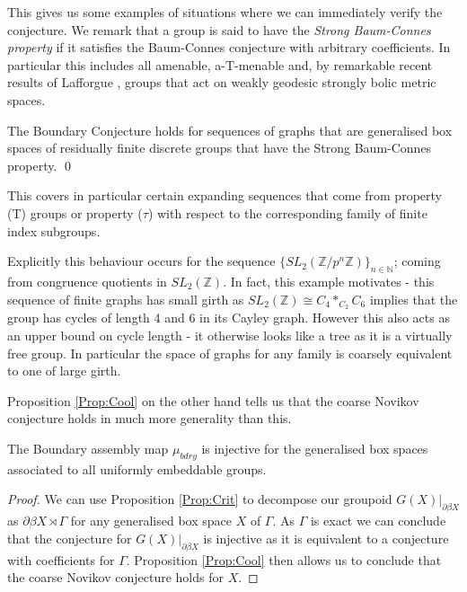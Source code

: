 \begin{conjecture}
This gives us some examples of situations where we can immediately verify the conjecture. We remark that a group is said to have the \textit{Strong Baum-Connes property} if it satisfies the Baum-Connes conjecture with arbitrary coefficients. In particular this includes all amenable, a-T-menable \cite{MR1487204} and, by remarkable recent results of Lafforgue \cite{lafforgue2012}, groups that act on weakly geodesic strongly bolic metric spaces.

\begin{theorem}
The Boundary Conjecture holds for sequences of graphs that are generalised box spaces of residually finite discrete groups that have the Strong Baum-Connes property. \qed
\end{theorem}

This covers in particular certain expanding sequences that come from property (T) groups or property ($\tau$) with respect to the corresponding family of finite index subgroups. 

Explicitly this behaviour occurs for the sequence $\lbrace SL_{2}(\mathbb{Z}/p^{n}\mathbb{Z})\rbrace_{n\in\mathbb{N}}$; coming from congruence quotients in $SL_{2}(\mathbb{Z})$. In fact, this example motivates \cite{MR2568691} - this sequence of finite graphs has small girth as $SL_{2}(\mathbb{Z}) \cong C_{4}\ast_{C_{2}}C_{6}$ implies that the group has cycles of length 4 and 6 in its Cayley graph. However this also acts as an upper bound on cycle length - it otherwise looks like a tree as it is a virtually free group. In particular the space of graphs for any family is coarsely equivalent to one of large girth. 

Proposition \ref{Prop:Cool} on the other hand tells us that the coarse Novikov conjecture holds in much more generality than this. 

\begin{theorem}\label{Thm:GBS}
The Boundary assembly map $\mu_{bdry}$ is injective for the generalised box spaces associated to all uniformly embeddable groups.
\end{theorem}
\begin{proof}
We can use Proposition \ref{Prop:Crit} to decompose our groupoid $G(X)|_{\partial \beta X}$ as $\partial\beta X \rtimes \Gamma$ for any generalised box space $X$ of $\Gamma$. As $\Gamma$ is exact we can conclude that the conjecture for $G(X)|_{\partial \beta X}$ is injective as it is equivalent to a conjecture with coefficients for $\Gamma$. Proposition \ref{Prop:Cool} then allows us to conclude that the coarse Novikov conjecture holds for $X$.
\end{proof}


\end{conjecture}
